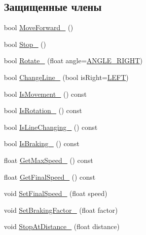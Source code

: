 \subsection*{Защищенные члены}
\begin{DoxyCompactItemize}
\item 
bool \hyperlink{classrtm_1_1_vehicle_object_a017a765353387080952f3ef1657c9463}{Move\+Forward\+\_\+} ()
\item 
bool \hyperlink{classrtm_1_1_vehicle_object_a74dd5fb7b16da79e1d288738ba43ded0}{Stop\+\_\+} ()
\item 
bool \hyperlink{classrtm_1_1_vehicle_object_a0739284311dc651679c0c5954f240758}{Rotate\+\_\+} (float angle=\hyperlink{namespacertm_a39212dd73aa5a6387211cf776bdb64d8}{A\+N\+G\+L\+E\+\_\+\+R\+I\+G\+HT})
\item 
bool \hyperlink{classrtm_1_1_vehicle_object_a73ef7c4f1318bdbe2cd75dc4f07aca4e}{Change\+Line\+\_\+} (bool is\+Right=\hyperlink{namespacertm_a92d29773a54951290dd89f754fb39a8c}{L\+E\+FT})
\item 
bool \hyperlink{classrtm_1_1_vehicle_object_adcccb796e4b1b404a25512fa8491cd43}{Is\+Movement\+\_\+} () const
\item 
bool \hyperlink{classrtm_1_1_vehicle_object_a7cb07a20e09d1460ec3d2dd70d62aba2}{Is\+Rotation\+\_\+} () const
\item 
bool \hyperlink{classrtm_1_1_vehicle_object_a464c8de22beb3cbf819d12ad36ae4974}{Is\+Line\+Changing\+\_\+} () const
\item 
bool \hyperlink{classrtm_1_1_vehicle_object_ab74eb10fd7df8238a437923cbf184bca}{Is\+Braking\+\_\+} () const
\item 
float \hyperlink{classrtm_1_1_vehicle_object_ad0dd345b8c1d7913034aaf3267ee4a03}{Get\+Max\+Speed\+\_\+} () const
\item 
float \hyperlink{classrtm_1_1_vehicle_object_a6cf4eb12c1eaf80b7f1e95ab206deae9}{Get\+Final\+Speed\+\_\+} () const
\item 
void \hyperlink{classrtm_1_1_vehicle_object_a0339478b106ebe22b63a6d076204cc22}{Set\+Final\+Speed\+\_\+} (float speed)
\item 
void \hyperlink{classrtm_1_1_vehicle_object_a3c2db832bf74ea5bd226e98e24b3da4b}{Set\+Braking\+Factor\+\_\+} (float factor)
\item 
void \hyperlink{classrtm_1_1_vehicle_object_a124909b0d2443d501d9b1eb8d359ad5a}{Stop\+At\+Distance\+\_\+} (float distance)
\end{DoxyCompactItemize}

